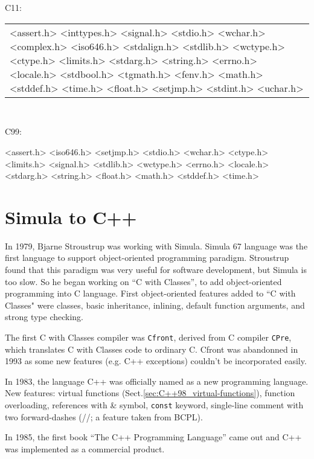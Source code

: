 \begin{minipage}[t]{0.4\textwidth}
C11:
\begin{tabular}{@{}p{1\linewidth}@{}}
<assert.h>
<inttypes.h>
<signal.h>
<stdio.h>
<wchar.h>
<complex.h>
<iso646.h>
<stdalign.h>
<stdlib.h>
<wctype.h>
<ctype.h>
<limits.h>
<stdarg.h>
<string.h>
<errno.h>
<locale.h>
<stdbool.h>
<tgmath.h>
<fenv.h>
<math.h> \verb!   !
<stddef.h>
<time.h>
<float.h>
<setjmp.h>
<stdint.h>
<uchar.h>
\end{tabular}
\end{minipage}
\begin{minipage}[t]{0.1\textwidth}
\verb!  !
\end{minipage}
\begin{minipage}[t]{0.4\textwidth}
C99:

<assert.h>
<iso646.h>
<setjmp.h>
<stdio.h>
<wchar.h>
<ctype.h> \verb!  !
<limits.h>
<signal.h>
<stdlib.h>
<wctype.h>
<errno.h>
<locale.h>
<stdarg.h>
<string.h>
<float.h>
<math.h>
<stddef.h>
<time.h>
\end{minipage}

\section{Simula to C++}

In 1979, Bjarne Stroustrup was working with Simula. Simula 67 language
was the first language to support object-oriented programming paradigm. Stroustrup found
that this paradigm was very useful for software development, but Simula is too
slow. So he began working on ``C with Classes'', to add object-oriented
programming into C language. First object-oriented features added to ``C
with Classes" were classes, basic inheritance, inlining, default function
arguments, and strong type checking.

The first C with Classes compiler was \verb!Cfront!, derived from C compiler
\verb!CPre!, which translates C with Classes code to ordinary C. Cfront was
abandonned in 1993 as some new features (e.g. C++ exceptions) couldn't be
incorporated easily.

In 1983, the language C++ was officially named as a new programming language.
New features: virtual functions (Sect.\ref{sec:C++98_virtual-functions}),
function overloading, references with \& symbol, \verb!const! keyword,
single-line comment with two forward-dashes (//; a feature taken from BCPL).

In 1985, the first book ``The C++ Programming Language'' came out and C++ was
implemented as a commercial product.

